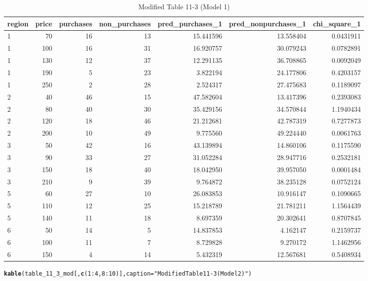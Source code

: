 \documentclass[11pt,notitlepage]{article}\usepackage[]{graphicx}\usepackage[]{color}
\makeatletter
\newcommand{\hlnum}[1]{\textcolor[rgb]{0.686,0.059,0.569}{#1}}%
\newcommand{\hlstr}[1]{\textcolor[rgb]{0.192,0.494,0.8}{#1}}%
\newcommand{\hlopt}[1]{\textcolor[rgb]{0,0,0}{#1}}%
\newcommand{\hlstd}[1]{\textcolor[rgb]{0.345,0.345,0.345}{#1}}%
\newcommand{\hlkwc}[1]{\textcolor[rgb]{0.333,0.667,0.333}{#1}}%
\newcommand{\hlkwd}[1]{\textcolor[rgb]{0.737,0.353,0.396}{\textbf{#1}}}%
\newenvironment{kframe}{%
 \def\at@end@of@kframe{}%
 \ifinner\ifhmode%
  \def\at@end@of@kframe{\end{minipage}}%
  \begin{minipage}{\columnwidth}%
 \fi\fi%
 \def\FrameCommand##1{\hskip\@totalleftmargin \hskip-\fboxsep
 \colorbox{shadecolor}{##1}\hskip-\fboxsep
     \hskip-\linewidth \hskip-\@totalleftmargin \hskip\columnwidth}%
 \MakeFramed {\advance\hsize-\width
   \@totalleftmargin\z@ \linewidth\hsize
   \@setminipage}}%
 {\par\unskip\endMakeFramed%
 \at@end@of@kframe}
\newenvironment{knitrout}{}{} %
\makeatother
\begin{document}
\begin{enumerate}[a)]
\begin{knitrout}
\begin{table}
\caption{Modified Table 11-3 (Model 1)}
\begin{tabular}{l|r|r|r|r|r|r}
\hline
region & price & purchases & non\_purchases & pred\_purchases\_1 & pred\_nonpurchases\_1 & chi\_square\_1\\
\hline
1 & 70 & 16 & 13 & 15.441596 & 13.558404 & 0.0431911\\
\hline
1 & 100 & 16 & 31 & 16.920757 & 30.079243 & 0.0782891\\
\hline
1 & 130 & 12 & 37 & 12.291135 & 36.708865 & 0.0092049\\
\hline
1 & 190 & 5 & 23 & 3.822194 & 24.177806 & 0.4203157\\
\hline
1 & 250 & 2 & 28 & 2.524317 & 27.475683 & 0.1189097\\
\hline
2 & 40 & 46 & 15 & 47.582604 & 13.417396 & 0.2393083\\
\hline
2 & 80 & 40 & 30 & 35.429156 & 34.570844 & 1.1940434\\
\hline
2 & 120 & 18 & 46 & 21.212681 & 42.787319 & 0.7277873\\
\hline
2 & 200 & 10 & 49 & 9.775560 & 49.224440 & 0.0061763\\
\hline
3 & 50 & 42 & 16 & 43.139894 & 14.860106 & 0.1175590\\
\hline
3 & 90 & 33 & 27 & 31.052284 & 28.947716 & 0.2532181\\
\hline
3 & 150 & 18 & 40 & 18.042950 & 39.957050 & 0.0001484\\
\hline
3 & 210 & 9 & 39 & 9.764872 & 38.235128 & 0.0752124\\
\hline
5 & 60 & 27 & 10 & 26.083853 & 10.916147 & 0.1090665\\
\hline
5 & 110 & 12 & 25 & 15.218789 & 21.781211 & 1.1564439\\
\hline
5 & 140 & 11 & 18 & 8.697359 & 20.302641 & 0.8707845\\
\hline
6 & 50 & 14 & 5 & 14.837853 & 4.162147 & 0.2159737\\
\hline
6 & 100 & 11 & 7 & 8.729828 & 9.270172 & 1.1462956\\
\hline
6 & 150 & 4 & 14 & 5.432319 & 12.567681 & 0.5408934\\
\hline
\end{tabular}
\end{table}

\begin{kframe}\begin{alltt}
\hlkwd{kable}\hlstd{(table_11_3_mod[,}\hlkwd{c}\hlstd{(}\hlnum{1}\hlopt{:}\hlnum{4}\hlstd{,} \hlnum{8}\hlopt{:}\hlnum{10}\hlstd{)],}\hlkwc{caption} \hlstd{=} \hlstr{"Modified Table 11-3 (Model 2)"}\hlstd{)}
\end{alltt}
\end{kframe}\begin{table}


\end{table}
\end{knitrout}
\end{enumerate}
\end{document}
